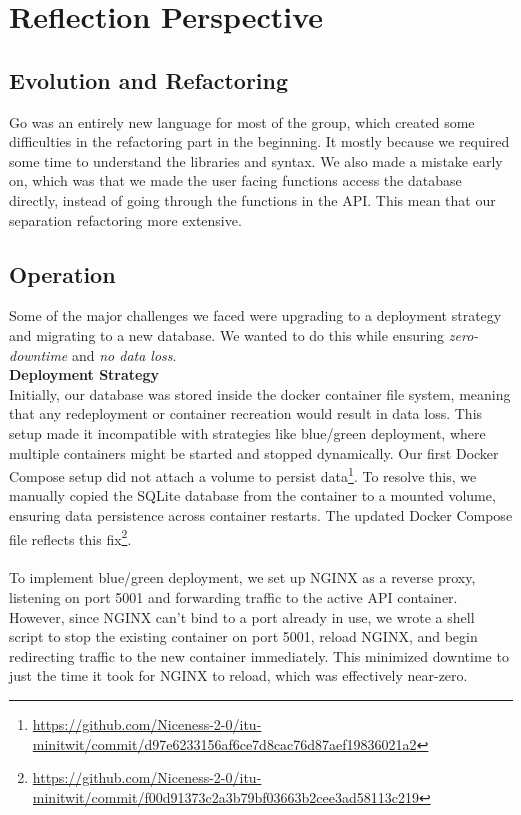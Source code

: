 \section{Reflection Perspective}
\subsection{Evolution and Refactoring}

Go was an entirely new language for most of the group, which created some difficulties in the refactoring part in the beginning. It mostly because we required some time to understand the libraries and syntax. 
We also made a mistake early on, which was that we made the user facing functions access the database directly, instead of going through the functions in the API. This mean that our separation refactoring more extensive.


\subsection{Operation}
Some of the major challenges we faced were upgrading to a deployment strategy and migrating to a new database. We wanted to do this while ensuring \textit{zero-downtime} and \textit{no data loss}.
\\

\noindent \textbf{Deployment Strategy}
\\
Initially, our database was stored inside the docker container file system, meaning that any redeployment or container recreation would result in data loss. This setup made it incompatible with strategies like blue/green deployment, where multiple containers might be started and stopped dynamically. Our first Docker Compose setup did not attach a volume to persist data\footnote{\url{https://github.com/Niceness-2-0/itu-minitwit/commit/d97e6233156af6ce7d8cac76d87aef19836021a2}}. To resolve this, we manually copied the SQLite database from the container to a mounted volume, ensuring data persistence across container restarts. The updated Docker Compose file reflects this fix\footnote{\url{https://github.com/Niceness-2-0/itu-minitwit/commit/f00d91373c2a3b79bf03663b2cee3ad58113c219}}.
\\
\\
To implement blue/green deployment, we set up NGINX as a reverse proxy, listening on port 5001 and forwarding traffic to the active API container. However, since NGINX can't bind to a port already in use, we wrote a shell script to stop the existing container on port 5001, reload NGINX, and begin redirecting traffic to the new container immediately. This minimized downtime to just the time it took for NGINX to reload, which was effectively near-zero.
\\

